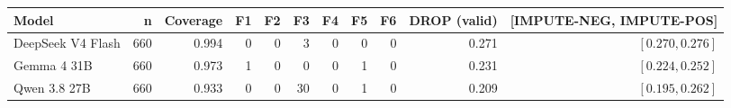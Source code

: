 \begin{tabular}{lrrrrrrrrrr}
\hline
Model & n & Coverage & F1 & F2 & F3 & F4 & F5 & F6 & DROP (valid) & [IMPUTE-NEG, IMPUTE-POS] \\
\hline
DeepSeek V4 Flash & 660 & 0.994 & 0 & 0 & 3 & 0 & 0 & 0 & 0.271 & $\left[0.270, 0.276\right]$ \\
Gemma 4 31B & 660 & 0.973 & 1 & 0 & 0 & 0 & 1 & 0 & 0.231 & $\left[0.224, 0.252\right]$ \\
Qwen 3.8 27B & 660 & 0.933 & 0 & 0 & 30 & 0 & 1 & 0 & 0.209 & $\left[0.195, 0.262\right]$ \\
\hline
\end{tabular}

